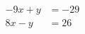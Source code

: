 \documentclass[border=5pt]{standalone}
\begin{document}
$\begin{aligned}
-9x+y&=-29\\8x-y&=26
\end{aligned}$
\end{document}
